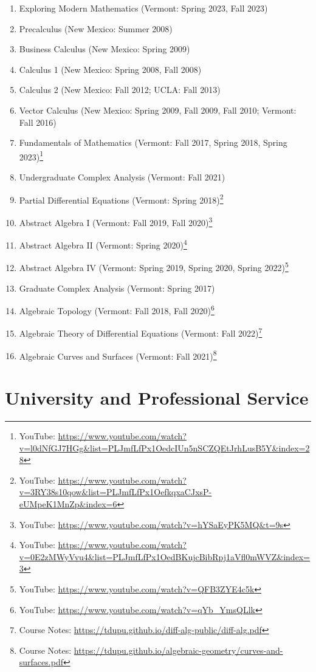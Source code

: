 \documentclass[a4paper,10pt]{article}
\begin{document}
\begin{enumerate}
	\item Exploring Modern Mathematics (Vermont: Spring 2023, Fall 2023)
	\item Precalculus (New Mexico: Summer 2008)
	\item Business Calculus (New Mexico: Spring 2009)
	\item Calculus 1 (New Mexico: Spring 2008, Fall 2008)
	\item Calculus 2 (New Mexico: Fall 2012; UCLA: Fall 2013)
	\item Vector Calculus (New Mexico: Spring 2009, Fall 2009, Fall 2010;  Vermont: Fall 2016)
	\item Fundamentals of Mathematics (Vermont: Fall 2017, Spring 2018, Spring 2023)\footnote{
		YouTube: \url{https://www.youtube.com/watch?v=l0dNfGJ7HGg&list=PLJmfLfPx1OedcIUn5nSCZQEtJrhLusB5Y&index=28}
	}
	\item Undergraduate Complex Analysis (Vermont: Fall 2021)
	\item Partial Differential Equations (Vermont: Spring 2018)\footnote{YouTube: \url{https://www.youtube.com/watch?v=3RY38s10qow&list=PLJmfLfPx1OefkqxaCJxsP-eUMpeK1MnZp&index=6}}
	\item Abstract Algebra I (Vermont: Fall 2019, Fall 2020)\footnote{YouTube: \url{https://www.youtube.com/watch?v=hYSaEyPK5MQ&t=9s}}
	\item Abstract Algebra II (Vermont: Spring 2020)\footnote{YouTube: \url{https://www.youtube.com/watch?v=0E2zMWyVvu4&list=PLJmfLfPx1OedBKujcBibRpj1aVfl0mWVZ&index=3}}
	\item Abstract Algebra IV (Vermont: Spring 2019, Spring 2020, Spring 2022)\footnote{YouTube: \url{https://www.youtube.com/watch?v=QFB3ZYE4c5k}}
	\item Graduate Complex Analysis (Vermont: Spring 2017)
	\item Algebraic Topology (Vermont: Fall 2018, Fall 2020)\footnote{YouTube: \url{https://www.youtube.com/watch?v=qYb_YmsQLlk}}
	\item Algebraic Theory of Differential Equations (Vermont: Fall 2022)\footnote{Course Notes: \url{https://tdupu.github.io/diff-alg-public/diff-alg.pdf}}
	\item Algebraic Curves and Surfaces (Vermont: Fall 2021)\footnote{Course Notes: \url{https://tdupu.github.io/algebraic-geometry/curves-and-surfaces.pdf}} 
\end{enumerate}

\section*{University and Professional Service}
\end{document}
